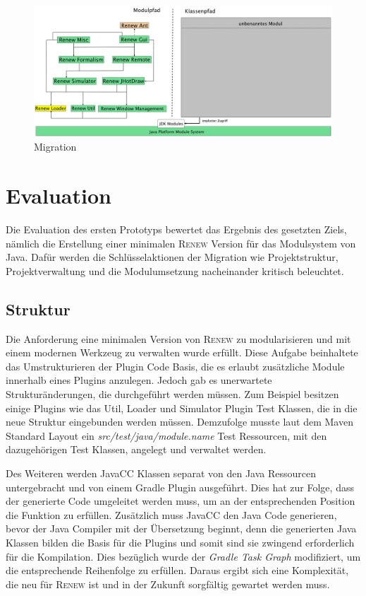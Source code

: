   	 \begin{figure}[h!] 
	  \centering
  	  \includegraphics[width=0.997\textwidth]{material/images/renew_plugin_dependencies-migrate_4b.pdf}
  	  \caption{Migration}
	  \label{fig:mig}
	\end{figure}

\newpage
\section{Evaluation}
	Die Evaluation des ersten Prototyps bewertet das Ergebnis des gesetzten Ziels, nämlich die Erstellung einer minimalen \textsc{Renew} Version für das Modulsystem von Java. Dafür werden die Schlüsselaktionen der Migration wie Projektstruktur, Projektverwaltung und die Modulumsetzung nacheinander kritisch beleuchtet.

\subsection{Struktur} \label{sub:struktur}
	Die Anforderung eine minimalen Version von \textsc{Renew} zu modularisieren und mit einem modernen Werkzeug zu verwalten wurde erfüllt. Diese Aufgabe beinhaltete das Umstrukturieren der Plugin Code Basis, die es erlaubt zusätzliche Module innerhalb eines Plugins anzulegen. Jedoch gab es unerwartete Strukturänderungen, die durchgeführt werden müssen. Zum Beispiel besitzen einige Plugins wie das Util, Loader und Simulator Plugin Test Klassen, die in die neue Struktur eingebunden werden müssen. Demzufolge musste laut dem Maven Standard Layout ein \textit{src/test/java/module.name} Test Ressourcen, mit den dazugehörigen Test Klassen, angelegt und verwaltet werden. \newline

	Des Weiteren werden JavaCC Klassen separat von den Java Ressourcen untergebracht und von einem Gradle Plugin ausgeführt. Dies hat zur Folge, dass der generierte Code umgeleitet werden muss, um an der entsprechenden Position die Funktion zu erfüllen. Zusätzlich muss JavaCC den Java Code generieren, bevor der Java Compiler mit der Übersetzung beginnt, denn die generierten Java Klassen bilden die Basis für die Plugins und somit sind sie zwingend erforderlich für die Kompilation. Dies bezüglich wurde der \textit{Gradle Task Graph} modifiziert, um die entsprechende Reihenfolge zu erfüllen. Daraus ergibt sich eine Komplexität, die neu für \textsc{Renew} ist und in der Zukunft sorgfältig gewartet werden muss. \bigbreak

